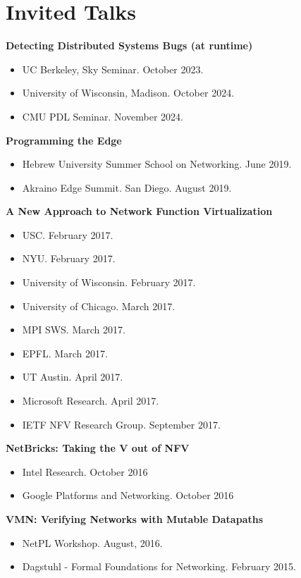 \documentclass[11pt,letterpaper,sans]{moderncv}        %
\begin{document}


\section{Invited Talks}
    \textbf{Detecting Distributed Systems Bugs (at runtime)}
    \begin{itemize}
        \item UC Berkeley, Sky Seminar. October 2023.
        \item University of Wisconsin, Madison. October 2024.
        \item CMU PDL Seminar. November 2024.
    \end{itemize}
    \textbf{Programming the Edge}
    \begin{itemize}
        \item Hebrew University Summer School on Networking. June 2019.
        \item Akraino Edge Summit. San Diego. August 2019.
    \end{itemize}
    \textbf{A New Approach to Network Function Virtualization}
    \begin{itemize}
        \item USC. February 2017.
        \item NYU. February 2017.
        \item University of Wisconsin. February 2017.
        \item University of Chicago. March 2017.
        \item MPI SWS. March 2017.
        \item EPFL. March 2017.
        \item UT Austin. April 2017.
        \item Microsoft Research. April 2017.
        \item IETF NFV Research Group. September 2017.
    \end{itemize}
    \textbf{NetBricks: Taking the V out of NFV}
    \begin{itemize}
        \item Intel Research. October 2016
        \item Google Platforms and Networking. October 2016
    \end{itemize}
    \textbf{VMN: Verifying Networks with Mutable Datapaths}
    \begin{itemize}
        \item NetPL Workshop. August, 2016.
        \item Dagstuhl - Formal Foundations for Networking. February 2015.
    \end{itemize}
\end{document}
